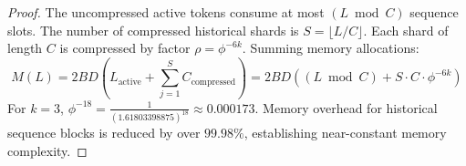 \begin{proof}
The uncompressed active tokens consume at most $(L \bmod C)$ sequence slots. The number of compressed historical shards is $S = \lfloor L / C \rfloor$. Each shard of length $C$ is compressed by factor $\rho = \phi^{-6k}$. Summing memory allocations:
\begin{equation}
    M(L) = 2BD \left(L_{\text{active}} + \sum_{j=1}^S C_{\text{compressed}}\right) = 2BD \left((L \bmod C) + S \cdot C \cdot \phi^{-6k}\right)
\end{equation}
For $k = 3$, $\phi^{-18} = \frac{1}{(1.61803398875)^{18}} \approx 0.000173$. Memory overhead for historical sequence blocks is reduced by over $99.98\%$, establishing near-constant memory complexity.
\end{proof}
